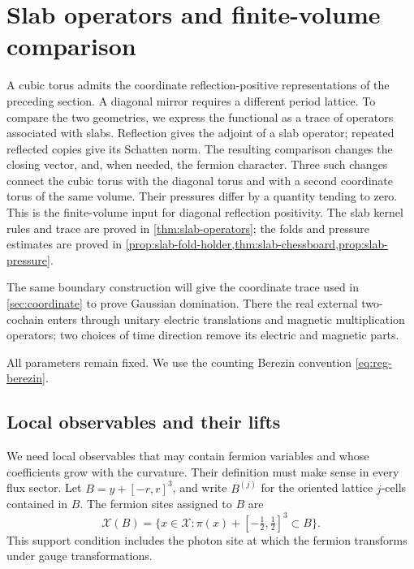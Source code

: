 \section{Slab operators and finite-volume comparison}\label{sec:slab-comparison}

A cubic torus admits the coordinate reflection-positive representations
of the preceding section. A diagonal mirror requires a different period
lattice. To compare the two geometries, we express the functional as a
trace of operators associated with slabs. Reflection gives the adjoint
of a slab operator; repeated reflected copies give its Schatten norm.
The resulting comparison changes the closing vector, and, when needed,
the fermion character. Three such changes connect the cubic torus with
the diagonal torus and with a second coordinate torus of the same volume.
Their pressures differ by a quantity tending to zero. This is the
finite-volume input for diagonal reflection positivity. The slab
kernel rules and trace are proved in \cref{thm:slab-operators};
the folds and pressure estimates are proved in
\cref{prop:slab-fold-holder,thm:slab-chessboard,prop:slab-pressure}.

The same boundary construction will give the coordinate trace used in
\cref{sec:coordinate} to prove Gaussian domination. There the real
external two-cochain enters through unitary electric translations and
magnetic multiplication operators; two choices of time direction
remove its electric and magnetic parts.

All parameters remain fixed. We use the counting Berezin convention
\eqref{eq:reg-berezin}.

\subsection{Local observables and their lifts}\label{subsec:slab-local}

We need local observables that may contain fermion variables and whose
coefficients grow with the curvature. Their definition must make sense
in every flux sector. Let $B=y+[-r,r]^3$, and write $B^{(j)}$ for the
oriented lattice $j$-cells contained in $B$. The fermion sites assigned
to $B$ are
\[
 \mathcal X(B)=\{x\in\mathcal X:
          \pi(x)+[-\tfrac12,\tfrac12]^3\subset B\}.
\]
This support condition includes the photon site at which the fermion
transforms under gauge transformations.

